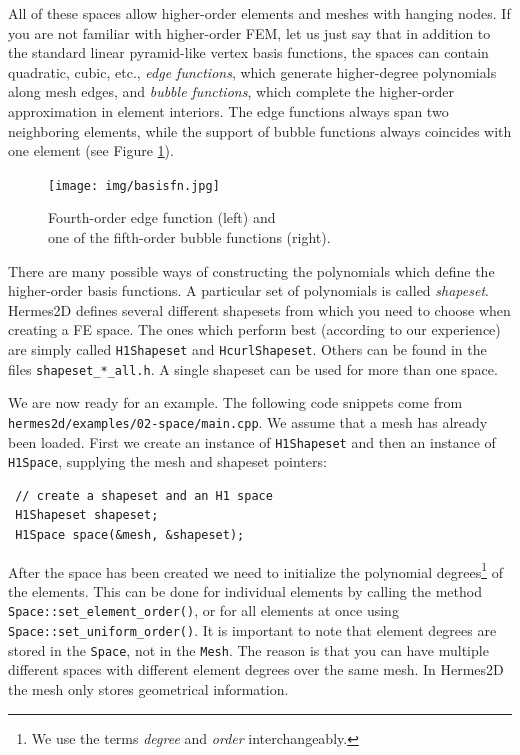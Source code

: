   
All of these spaces allow higher-order elements and meshes with hanging nodes.
If you are not familiar with higher-order FEM, let us just say that in addition
to the standard linear pyramid-like vertex basis functions, the spaces can contain
quadratic, cubic, etc., {\em edge functions}, which generate higher-degree
polynomials along mesh edges, and {\em bubble functions}, which complete the higher-order
approximation in element interiors. The edge functions always span two neighboring
elements, while the support of bubble functions always coincides with
one element (see Figure \ref{fig:basisfn}).

\begin{figure}[ht]
  \centering\bigskip
  \texttt{[image: img/basisfn.jpg]}
  \caption{\centering Fourth-order edge function (left) and \\
           one of the fifth-order bubble functions (right).}
  \label{fig:basisfn}
\end{figure}

There are many possible ways of constructing the polynomials which define the
higher-order basis functions. A particular set of polynomials is called
\emph{shapeset}. Hermes2D defines several different shapesets from which
you need to choose when creating a FE space. The ones which perform best
(according to our experience) are simply called {\tt H1Shapeset} and {\tt HcurlShapeset}.
Others can be found in the files {\tt shapeset\_*\_all.h}. A single shapeset
can be used for more than one space.

We are now ready for an example. The following code snippets come from
\verb"hermes2d/examples/02-space/main.cpp". We assume that a mesh has already
been loaded. First we create an instance of {\tt H1Shapeset} and then an
instance of {\tt H1Space}, supplying the mesh and shapeset pointers:

\begin{lstlisting}
 // create a shapeset and an H1 space
 H1Shapeset shapeset;
 H1Space space(&mesh, &shapeset);
\end{lstlisting}

After the space has been created we need to initialize the polynomial
degrees\footnote{We use the terms \emph{degree} and \emph{order} interchangeably.}
of the elements. This can be done for individual elements by calling the method
\verb"Space::set_element_order()", or for all elements at once using
\verb"Space::set_uniform_order()". It is important to note that element degrees
are stored in the {\tt Space}, not in the {\tt Mesh}. The reason is that you can
have multiple different spaces with different element degrees over the same mesh.
In Hermes2D the mesh only stores geometrical information.

